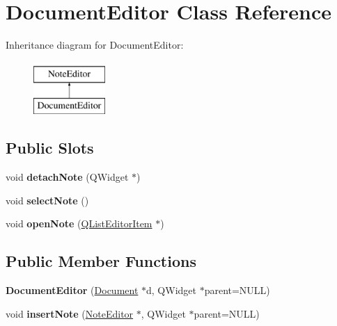 \hypertarget{classDocumentEditor}{\section{\-Document\-Editor \-Class \-Reference}
\label{classDocumentEditor}
}
\-Inheritance diagram for \-Document\-Editor\-:\begin{figure}[H]
\begin{center}
\leavevmode
\includegraphics[height=2.000000cm]{classDocumentEditor}
\end{center}
\end{figure}
\subsection*{\-Public \-Slots}
\begin{DoxyCompactItemize}
\item 
\hypertarget{classDocumentEditor_a60c1c8cd663639290a501cc39c251b19}{void {\bfseries detach\-Note} (\-Q\-Widget $\ast$)}\label{classDocumentEditor_a60c1c8cd663639290a501cc39c251b19}

\item 
\hypertarget{classDocumentEditor_a9e770766f29b660cf9e92a17d4566160}{void {\bfseries select\-Note} ()}\label{classDocumentEditor_a9e770766f29b660cf9e92a17d4566160}

\item 
\hypertarget{classDocumentEditor_ae2dcc2a001ced712679623726dfab6ba}{void {\bfseries open\-Note} (\hyperlink{classQListEditorItem}{\-Q\-List\-Editor\-Item} $\ast$)}\label{classDocumentEditor_ae2dcc2a001ced712679623726dfab6ba}

\end{DoxyCompactItemize}
\subsection*{\-Public \-Member \-Functions}
\begin{DoxyCompactItemize}
\item 
\hypertarget{classDocumentEditor_a01dd7e801b855544b12d7b19f5bb86f0}{{\bfseries \-Document\-Editor} (\hyperlink{classDocument}{\-Document} $\ast$d, \-Q\-Widget $\ast$parent=\-N\-U\-L\-L)}\label{classDocumentEditor_a01dd7e801b855544b12d7b19f5bb86f0}

\item 
\hypertarget{classDocumentEditor_ad665510a938c917752d29d59750a2a7b}{void {\bfseries insert\-Note} (\hyperlink{classNoteEditor}{\-Note\-Editor} $\ast$, \-Q\-Widget $\ast$parent=\-N\-U\-L\-L)}\label{classDocumentEditor_ad665510a938c917752d29d59750a2a7b}

\end{DoxyCompactItemize}
